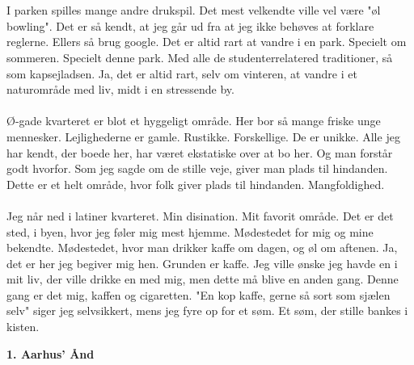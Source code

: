 \documentclass[]{article}
\begin{document}
\\ \\
I parken spilles mange andre drukspil. Det mest velkendte ville vel være "øl bowling". Det er så kendt, at jeg går ud fra at jeg ikke behøves at forklare reglerne. Ellers så brug google. Det er altid rart at vandre i en park. Specielt om sommeren. Specielt denne park. Med alle de studenterrelatered traditioner, så som kapsejladsen. Ja, det er altid rart, selv om vinteren, at vandre i et naturområde med liv, midt i en stressende by.
\\ \\
Ø-gade kvarteret er blot et hyggeligt område. Her bor så mange friske unge mennesker. Lejlighederne er gamle. Rustikke. Forskellige. De er unikke. Alle jeg har kendt, der boede her, har været ekstatiske over at bo her. Og man forstår godt hvorfor. Som jeg sagde om de stille veje, giver man plads til hindanden. Dette er et helt område, hvor folk giver plads til hindanden. Mangfoldighed.
\\ \\
Jeg når ned i latiner kvarteret. Min disination. Mit favorit område. Det er det sted, i byen, hvor jeg føler mig mest hjemme. Mødestedet for mig og mine bekendte. Mødestedet, hvor man drikker kaffe om dagen, og øl om aftenen. Ja, det er her jeg begiver mig hen. Grunden er kaffe. Jeg ville ønske jeg havde en i mit liv, der ville drikke en med mig, men dette må blive en anden gang. Denne gang er det mig, kaffen og cigaretten. "En kop kaffe, gerne så sort som sjælen selv" siger jeg selvsikkert, mens jeg fyre op for et søm. Et søm, der stille bankes i kisten.

\begin{center}
	\large\textbf{1. Aarhus' Ånd}
\end{center}
\end{document}
